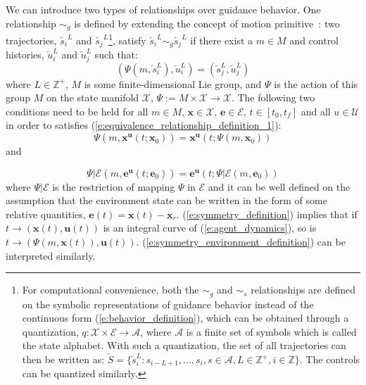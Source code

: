 \documentclass[journal]{IEEEtran}
\begin{document}
We can introduce two types of relationships over guidance behavior. One relationship $\sim_g$ is defined by extending the concept of motion primitive~\cite{frazzoli2005maneuver}: two trajectories, $\overleftarrow{s_i}^L$ and $\overleftarrow{s_j}^L$\footnote{For computational convenience, both the $\sim_g$ and $\sim_s$ relationships are defined on the symbolic representations of guidance behavior instead of the continuous form (\ref{e:behavior_definition}), which can be obtained through a quantization, $q: \mathcal{X} \times \mathcal{E}  \rightarrow \mathcal{A}$, where $\mathcal{A}$ is a finite set of symbols which is called the state alphabet. With such a quantization, the set of all trajectories can then be written as: $\overleftarrow{S} = \{\overleftarrow{s}^L_i:s_{i-L+1},...,s_{i}, s \in
\mathcal {A}, L \in \mathbb{Z}^+, i \in \mathbb{Z}\}$. The controls can be quantized similarly.}, satisfy $\overleftarrow{s_i}^L \sim_g \overleftarrow{s_j}^L$ if there exist a $m \in M$ and control histories, $\overleftarrow{u}^L_i$ and $\overleftarrow{u}^L_j$ such that:
\begin{equation}
(\Psi(m,\overleftarrow{s}^L_i),\overleftarrow{u}^L_i) = (\overleftarrow{s}^L_j,\overleftarrow{u}^L_j)
\label{e:equivalence_relationship_definition_1}
\end{equation} 
where $L\in \mathbb{Z}^+$, $M$ is some finite-dimensional Lie group, and $\Psi$ is the action of this group $M$ on the state manifold $\mathcal{X}$, $\Psi:= M \times \mathcal{X} \rightarrow \mathcal{X}$. The following two conditions need to be held for all $m \in M$, $\mathbf{x} \in \mathcal{X}$, $\mathbf{e} \in \mathcal{E}$, $t \in [t_0,t_f]$ and all $u \in \mathcal{U}$ in order to satisfies (\ref{e:equivalence_relationship_definition_1}): 
\begin{equation}
\Psi(m,\mathbf{x}^\mathbf{u}(t;\mathbf{x}_0)) = \mathbf{x}^\mathbf{u}(t;\Psi(m,\mathbf{x}_0))
\label{e:symmetry_definition}
\end{equation} 
and

\begin{equation}
\Psi|\mathcal{E}(m,\mathbf{e}^\mathbf{u}(t;\mathbf{e}_0)) = \mathbf{e}^\mathbf{u}(t;\Psi|\mathcal{E}(m,\mathbf{e}_0))
\label{e:symmetry_environment_definition}
\end{equation} 
where $\Psi|\mathcal{E}$ is the restriction of mapping $\Psi$ in $\mathcal{E}$ and it can be well defined on the assumption that the environment state can be written in the form of some relative quantities, $\mathbf{e}(t) = \mathbf{x}(t) - \mathbf{x}_r$. (\ref{e:symmetry_definition}) implies that if $t \rightarrow (\mathbf{x}(t),\mathbf{u}(t))$ is an integral curve of (\ref{e:agent_dynamics}), so is $t \rightarrow (\Psi(m,\mathbf{x}(t)),\mathbf{u}(t))$. (\ref{e:symmetry_environment_definition}) can be interpreted similarly. 
\end{document}
